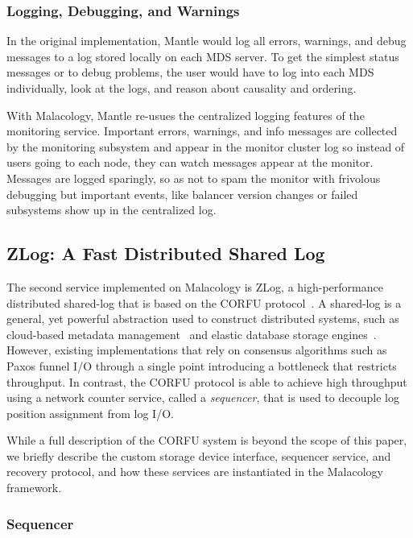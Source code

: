 \documentclass[preprint]{sigplanconf-eurosys}
\begin{document}
\subsubsection{Logging, Debugging, and Warnings}

In the original implementation, Mantle would log all errors, warnings, and
debug messages to a log stored locally on each MDS server. To get the simplest
status messages or to debug problems, the user would have to log into each MDS
individually, look at the logs, and reason about causality and ordering.

With Malacology, Mantle re-usues the centralized logging features of the
monitoring service. Important errors, warnings, and info messages are
collected
by the monitoring subsystem and appear in the monitor cluster log so instead of users
going to each node, they can watch messages appear at the monitor. Messages are
logged sparingly, so as not to spam the monitor with frivolous debugging but
important events, like balancer version changes or failed subsystems show up in the
centralized log.

\subsection{ZLog: A Fast Distributed Shared Log}
\label{sec:zlog}

The second service implemented on Malacology is ZLog, a high-performance
distributed shared-log that is based on the CORFU
protocol~\cite{balakrishnan_corfu_2012}. A shared-log is a general, yet
powerful abstraction used to construct distributed systems, such as
cloud-based metadata management~\cite{balakrishnan:sosp13} and elastic database
storage engines~\cite{bernstein:cidr11,bernstein:vldb11,bernstein:sigmod15}.
However, existing implementations that rely on consensus algorithms such as
Paxos funnel I/O through a single point introducing a bottleneck that restricts
throughput.  In contrast, the CORFU protocol is able to achieve high throughput
using a network counter service, called a \emph{sequencer}, that is used to
decouple log position assignment from log I/O.

While a full description of the CORFU system is beyond the scope of this
paper, we briefly describe the custom storage device interface, sequencer
service, and recovery protocol, and how these services are instantiated in the
Malacology framework.

\subsubsection{Sequencer}
\label{sec:seq}
\end{document}
